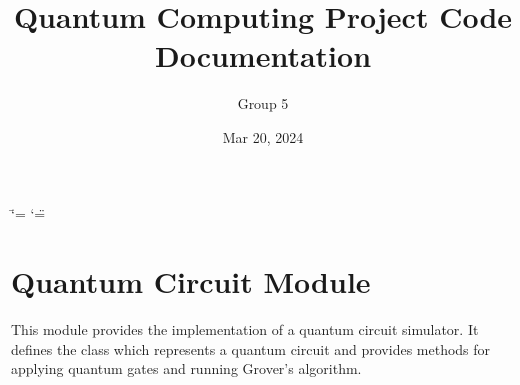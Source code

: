 \documentclass[letterpaper,10pt,english]{sphinxmanual}
\title{Quantum Computing Project Code Documentation}
\date{Mar 20, 2024}
\author{
Group 5
}
\begin{document}
\ifdefined\shorthandoff
  \ifnum\catcode`\=\string=\active\shorthandoff{=}\fi
  \ifnum\catcode`\"=\active{}\fi
\fi

\pagestyle{empty}
\sphinxmaketitle
\pagestyle{plain}
\sphinxtableofcontents
\pagestyle{normal}
\label{\detokenize{index::doc}}


\chapter{Quantum Circuit Module}
\label{\detokenize{index:quantum-circuit-module}}\label{\detokenize{index:module-qc}}
\sphinxAtStartPar
This module provides the implementation of a quantum circuit simulator.
It defines the  class which represents a quantum circuit and
provides methods for applying quantum gates and running Grover’s algorithm.
\end{document}
